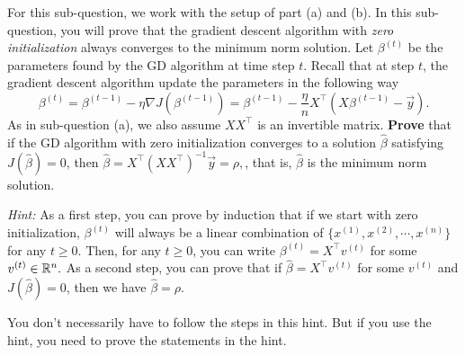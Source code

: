 \item{} For this sub-question, we work with the setup of part (a) and (b). In this sub-question, you will prove that the gradient descent algorithm with \emph{zero initialization} always converges to the minimum norm solution. Let $\beta^{(t)}$ be the parameters found by the GD algorithm at time step $t$. Recall that at step $t$, the gradient descent algorithm update the parameters in the following way
\begin{equation}
	\beta^{(t)}=\beta^{(t-1)}-\eta\nabla J(\beta^{(t-1)})=\beta^{(t-1)}-\frac{\eta}{n} X^\top (X\beta^{(t-1)}-\vec{y}).
\end{equation}
As in sub-question (a), we also assume $X X^\top$ is an invertible matrix. \textbf{Prove} that if the GD algorithm  with zero initialization converges to a solution $\hat{\beta}$ satisfying $J(\hat{\beta})=0$, then $\hat{\beta}=X^\top(XX^\top)^{-1}\vec{y}=\rho,$, that is, $\hat{\beta}$ is the minimum norm solution.

\emph{Hint:} As a first step, you can prove by induction that if we start with zero initialization, $\beta^{(t)}$ will always be a linear combination of $\{x^{(1)}, x^{(2)}, \cdots, x^{(n)}\}$ for any $t\ge 0.$ Then, for any $t\ge 0$, you can write $\beta^{(t)}=X^\top v^{(t)}$ for some $v^{(t)}\in \mathbb{R}^{n}.$ As a second step, you can prove that if $\hat{\beta}=X^\top v^{(t)}$ for some $v^{(t)}$ and $J(\hat{\beta})=0$, then we have $\hat{\beta}=\rho.$

You don't necessarily have to follow the steps in this hint. But if you use the hint, you need to prove the statements in the hint.
